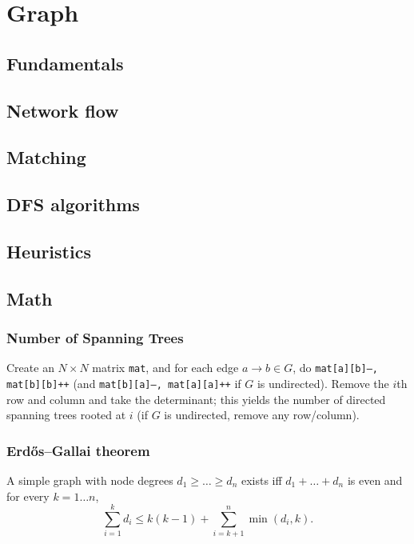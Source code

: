 \chapter{Graph}

\section{Fundamentals}

\section{Network flow}

\section{Matching}

\section{DFS algorithms}

\section{Heuristics}

\section{Math}
	\subsection{Number of Spanning Trees}
		Create an $N\times N$ matrix \texttt{mat}, and for each edge $a \rightarrow b \in G$, do
		\texttt{mat[a][b]--, mat[b][b]++} (and \texttt{mat[b][a]--, mat[a][a]++} if $G$ is undirected).
		Remove the $i$th row and column and take the determinant; this yields the number of directed spanning trees rooted at $i$
		(if $G$ is undirected, remove any row/column).

	\subsection{Erdős–Gallai theorem}
		A simple graph with node degrees $d_1 \ge \dots \ge d_n$ exists iff $d_1 + \dots + d_n$ is even and for every $k = 1\dots n$,
		\[ \sum _{i=1}^{k}d_{i}\leq k(k-1)+\sum _{i=k+1}^{n}\min(d_{i},k). \]
